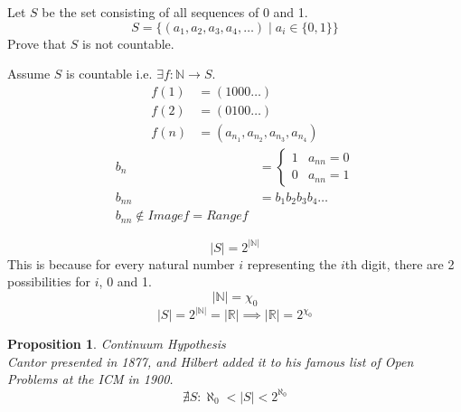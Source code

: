 \documentclass[letterpaper, 12pt]{article}
\newtheorem{proposition}[theorem]{Proposition}
\newenvironment{proof}[1][Proof]{\begin{trivlist}
\item[\hskip \labelsep {\bfseries #1}]}{\end{trivlist}}
\newenvironment{example}[1][Example]{\begin{trivlist}
\item[\hskip \labelsep {\bfseries #1}]}{\end{trivlist}}
\newcommand{\naturals}{\mathbb{N}}
\newcommand{\reals}{\mathbb{R}}
\begin{document}
    \begin{example}
        Let $S$ be the set consisting of all sequences of 0 and 1.
        \[S = \{(a_1, a_2, a_3, a_4, \dots) \mid a_i \in \{0, 1\}\}\]
        Prove that $S$ is not countable.
        \begin{proof}
            Assume $S$ is countable i.e. $\exists f : \naturals \rightarrow S$.
            \begin{align*}
                f(1) &= (1000\dots) \\
                f(2) &= (0100\dots) \\
                f(n) &= (a_{n_1}, a_{n_2}, a_{n_3}, a_{n_4})
            \end{align*}
            \begin{align*}
                b_n &= \begin{cases}
                    1 & a_{nn} = 0 \\
                    0 & a_{nn} = 1
                \end{cases} \\
                b_{nn} &= b_1 b_2 b_3 b_4 \dots \\
                b_{nn} \notin Image f = Range f
            \end{align*}
        \end{proof}
        \[|S| = 2^{|\naturals|}\]
        This is because for every natural number $i$ representing the $i$th digit, there are 
        2 possibilities for $i$, 0 and 1.
        \[|\naturals| = \chi_0\]
        \[|S| = 2^{|\naturals|} = |\reals| \implies |\reals| = 2^{\chi_0}\]
    \end{example}
    \begin{proposition}
        Continuum Hypothesis \\
        Cantor presented in 1877, and Hilbert added it to his famous list of Open Problems 
        at the ICM in 1900.
        \[\nexists S: \aleph_0 < |S| < 2^{\aleph_0}\]
    \end{proposition}
\end{document}
